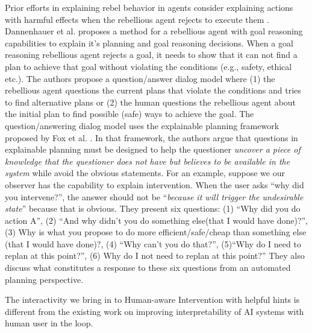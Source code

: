 Prior efforts in explaining rebel behavior in agents consider explaining actions with harmful effects when the rebellious agent rejects to execute them \cite{briggs2015,greggsmith2015}.
Dannenhauer et al. \citeyear{dannenhauer2018explaining} proposes a method for a rebellious agent with goal reasoning capabilities to explain it's planning and goal reasoning decisions. 
When a goal reasoning rebellious agent rejects a goal, it needs to show that it can not find a plan to achieve that goal without violating the conditions (e.g., safety, ethical etc.).
The authors propose a question/answer dialog model where (1) the rebellious agent questions the current plans that violate the conditions and tries to find alternative plans or (2) the human questions the rebellious agent about the initial plan to find possible (safe) ways to achieve the goal.
The question/answering dialog model uses the explainable planning framework proposed by Fox et al. \cite{fox2017xai}.
In that framework, the authors argue that questions in explainable planning must be designed to help the questioner \textit{uncover a piece of knowledge that the questioner does not have but believes to be available in the system} while avoid the obvious statements.  
For an example, suppose we our observer has the capability to explain intervention. When the user asks ``why did you intervene?'', the answer should not be ``\textit{because it will trigger the undesirable state}'' because that is obvious.
They present six questions: (1) ``Why did you do action A'', (2) ``And why didn’t you do something else(that I would have done)?'', (3) Why   is   what   you   propose   to   do   more   efficient/safe/cheap than something else (that I would have done)?, (4) ``Why can’t you do that?'', (5)``Why do I need to replan at this point?'', (6) Why do I not need to replan at this point?''
They also discuss what constitutes a response to these six questions from an automated planning perspective.



The interactivity we bring in to Human-aware Intervention with helpful hints is different from the existing work on improving interpretability of AI systems with human user in the loop.







